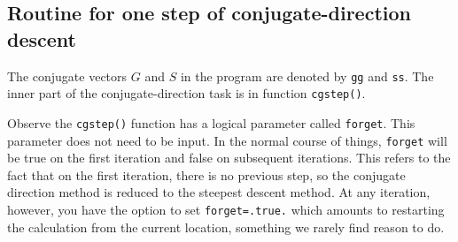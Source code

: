 \subsection{Routine for one step of conjugate-direction descent}
\par
\begin{comment}
The \bx{conjugate-direction program}
can be divided into two parts:
an inner part that is used almost without change
over a wide variety of applications,
and an outer part containing memory allocations,
operator invocations, and initializations.

Because \bx{Fortran} does not recognize the difference between upper- and
lower-case letters,
\end{comment}
The conjugate vectors $G$ and $S$ in the program are denoted by
{\tt gg} and {\tt ss}.
The inner part of the conjugate-direction task is in
function {\tt cgstep()}.%
\par
Observe the \texttt{cgstep()} function has a logical parameter
called \texttt{forget}.
This parameter does not need to be input.
In the normal course of things, \texttt{forget} will be true
on the first iteration and false on subsequent iterations.
This refers to the fact that on the first iteration,
there is no previous step,
so the conjugate direction method
is reduced to the steepest descent method.
At any iteration, however, you have the option to set
\texttt{forget=.true.}
which amounts to restarting the calculation
from the current location,
something we rarely find reason to do.


